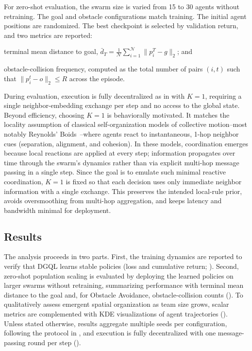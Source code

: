 For zero-shot evaluation, 
 the swarm size is varied from 15 to 30 agents without retraining. 
%
The goal and obstacle configurations match training. 
%
The initial agent positions are randomized. 
%
The best checkpoint is selected by validation return, and two metrics are reported:
\begin{enumerate*}[label=(\roman*)]
    \item terminal mean distance to goal,
     \(\bar{d}_T = \frac{1}{\mathcal{N}}\sum_{i=1}^{\mathcal{N}} \lVert p_i^{T} - g \rVert_2\); and
    \item obstacle-collision frequency, 
     computed as the total number of pairs \((i,t)\) such that \(\lVert p_i^{t} - o \rVert_2 \le R\) across the episode. 
\end{enumerate*}
%
During evaluation, 
 execution is fully decentralized as in  with \(K=1\), 
 requiring a single neighbor-embedding exchange per step and no access to the global state.
%
Beyond efficiency, 
 choosing \(K=1\) is behaviorally motivated. 
%
It matches the locality assumption of classical self-organization models of collective motion--most notably 
 Reynolds' Boids~\cite{DBLP:conf/siggraph/Reynolds87}--where agents react to instantaneous, 
 1-hop neighbor cues (separation, alignment, and cohesion). 
%
In these models, 
 coordination emerges because local reactions are applied at every step; 
 information propagates over time through the swarm's dynamics rather
 than via explicit multi-hop message passing in a single step. 
%
Since the goal is to emulate such minimal reactive coordination, 
 \(K=1\) is fixed so that each decision uses only immediate neighbor information with a single exchange. 
%
This preserves the intended local-rule prior, 
 avoids oversmoothing from multi-hop aggregation, 
 and keeps latency and bandwidth minimal for deployment.

\subsection{Results}
The analysis proceeds in two parts. 
%
First, 
 the training dynamics are reported to verify that DGQL learns stable policies 
 (loss and cumulative return; ). 
%
Second, 
 zero-shot population scaling is evaluated by deploying the learned policies on larger swarms without retraining, 
 summarizing performance with terminal mean distance to the goal and, 
 for Obstacle Avoidance, obstacle-collision counts (). 
%
To qualitatively assess emergent spatial organization as team size grows, 
 scalar metrics are complemented with KDE visualizations of agent trajectories ().
%
Unless stated otherwise, 
 results aggregate multiple seeds per configuration, 
 following the protocol in , 
 and execution is fully decentralized with one message-passing round per step ().

